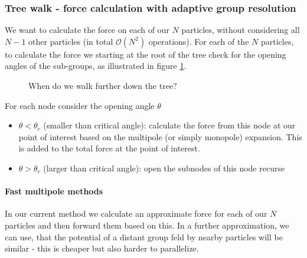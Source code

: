 \subsubsection{Tree walk - force calculation with adaptive group resolution}
We want to calculate the force on each of our $N$ particles, without
considering all $N-1$ other particles (in total $\mathcal{O}(N^2)$ operations).
For each of the $N$ particles, to calculate the force we
starting at the root of the tree check for the opening angles of
the sub-groups, as illustrated in figure \ref{fig:tree_walk}.

\begin{figure}[H]
    \centering
    
    \caption{When do we walk further down the tree?}
    \label{fig:tree_walk}
\end{figure}

For each node consider the opening angle $\theta$
\begin{itemize}
    \item $\theta < \theta_c$ (smaller than critical angle): calculate the force from this node at our point of interest based on the multipole (or simply monopole) expansion. This is added to the total force at the point of interest.
    \item $\theta > \theta_c$ (larger than critical angle): open the subnodes of this node recurse
\end{itemize}


\paragraph*{Fast multipole methods} In our current method we calculate an approximate force for each of our $N$ particles and then forward them based on this. In a further approximation, we can use, that the potential of a distant group feld by nearby particles will be similar - this 
is cheaper but also harder to parallelize.

